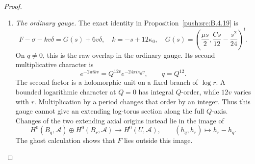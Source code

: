 \begin{proof}
\begin{enumerate}[label=\arabic*.,leftmargin=*]
\item \emph{The ordinary gauge.}
The exact identity in Proposition~\ref{push:src:B.4.19} is
\begin{equation}
 F-\sigma-kv\delta=G(s)+6v\delta,
 \quad k=-s+12\kappa_0,
 \quad G(s)=\left(\frac{\mu s}2,
                  \frac{Cs}{12}-\frac{s^2}{24}\right)^t.
\label{pub:I:eq:B-4-24-7}
\end{equation}
On $q\ne0$, this is the raw overlap in the ordinary gauge. Its second multiplicative character is
\[
 e^{-2\pi i kv}=Q^{12v}e^{-24\pi i\kappa_0v},\qquad q=Q^{12}.
\]
The second factor is a holomorphic unit on a fixed branch of $\log r$. A bounded logarithmic character at $Q=0$ has integral $Q$-order, while $12v$ varies with $r$. Multiplication by a period changes that order by an integer. Thus this gauge cannot give an extending log-torus section along the full $Q$-axis. Changes of the two extending axial origins instead lie in the image of
\[
 H^0(B_q,\mathcal A)\oplus H^0(B_r,\mathcal A)
 \longrightarrow H^0(U,\mathcal A),\qquad(h_q,h_r)\longmapsto h_r-h_q.
\]
The ghost calculation shows that $F$ lies outside this image.

\end{enumerate}
\end{proof}